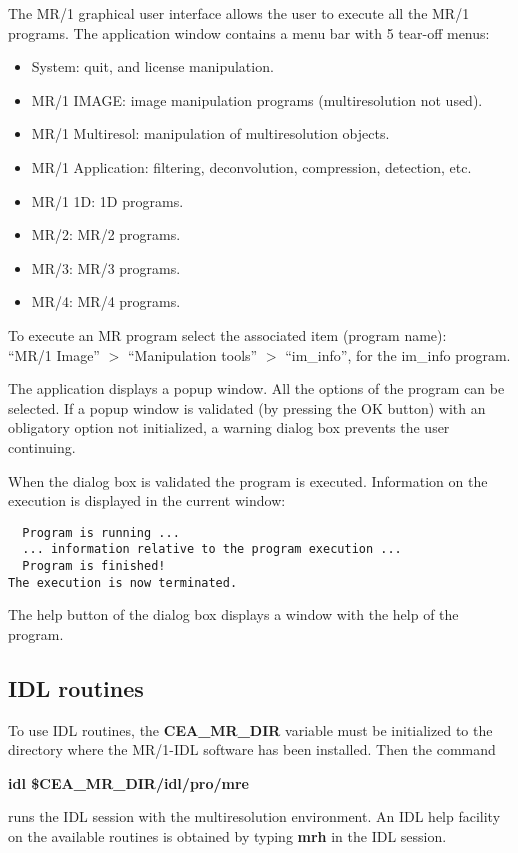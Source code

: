 The MR/1 graphical user interface allows the user to execute all the MR/1  
programs.
The application window contains a menu bar with 5 tear-off menus: 
\begin{itemize}
\item System: quit, and license manipulation.
\item MR/1 IMAGE: image manipulation programs (multiresolution not used).
\item MR/1 Multiresol: manipulation of multiresolution objects.
\item MR/1 Application: filtering, deconvolution, compression, detection, etc.
\item MR/1 1D: 1D programs.
\item MR/2: MR/2 programs.
\item MR/3: MR/3 programs.
\item MR/4: MR/4 programs.
\end{itemize}
To execute an MR program select the associated item (program name): \\
``MR/1 Image'' $>$ ``Manipulation tools'' $>$ ``im\_info'', 
for the im\_info program.  

The application displays a popup window. All the options of the 
program can be
selected. If a popup window is validated (by pressing the  
OK button) with an obligatory 
option not initialized, a warning dialog box prevents the user continuing.

When the dialog box is validated the program is executed. 
Information on the execution is displayed in the current window: 
\begin{verbatim}
  Program is running ...
  ... information relative to the program execution ...
  Program is finished!
The execution is now terminated.
\end{verbatim}

The help button of the dialog box displays a window with the help of the 
program.


\subsection{IDL routines}

To use IDL routines, the {\bf CEA\_MR\_DIR}  variable 
must be initialized to the directory
where the MR/1-IDL software has been installed. Then 
the command
\begin{center}
{\bf idl \$CEA\_MR\_DIR/idl/pro/mre} 
\end{center}
runs the IDL session with the 
multiresolution environment. An IDL help facility on the available routines
is obtained by typing {\bf mrh} in the IDL session. 


